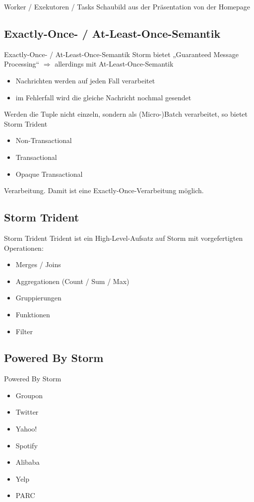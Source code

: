\documentclass{beamer}
\begin{document}
\begin{frame}[t]{Worker / Exekutoren / Tasks}
  Schaubild aus der Präsentation von der Homepage
\end{frame}


\subsection{Exactly-Once- / At-Least-Once-Semantik}
\begin{frame}[t]{Exactly-Once- / At-Least-Once-Semantik}
  Storm bietet „Guaranteed Message Processing“ $\Rightarrow$ allerdings mit
  At-Least-Once-Semantik
  \begin{itemize}
    \item Nachrichten werden auf jeden Fall verarbeitet
    \item im Fehlerfall wird die gleiche Nachricht nochmal gesendet
  \end{itemize}
  Werden die Tuple nicht einzeln, sondern als (Micro-)Batch verarbeitet, so bietet Storm Trident
  \begin{itemize}
    \item Non-Transactional
    \item Transactional
    \item Opaque Transactional
  \end{itemize}
  Verarbeitung. Damit ist eine Exactly-Once-Verarbeitung möglich.
\end{frame}

\subsection{Storm Trident}
\begin{frame}[t]{Storm Trident}
  Trident ist ein High-Level-Aufsatz auf Storm mit vorgefertigten Operationen:
  \begin{itemize}
    \item Merges / Joins
    \item Aggregationen (Count / Sum / Max)
    \item Gruppierungen
    \item Funktionen
    \item Filter
  \end{itemize}
\end{frame}

\subsection{Powered By Storm}
\begin{frame}[t]{Powered By Storm}
  \begin{itemize}
    \item Groupon
    \item Twitter
    \item Yahoo!
    \item Spotify
    \item Alibaba
    \item Yelp
    \item PARC
  \end{itemize}
\end{frame}
\end{document}
